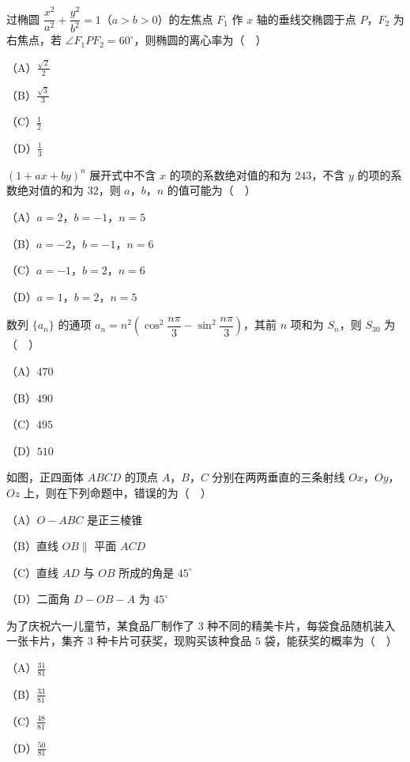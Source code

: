 \begin{question}
过椭圆 $\dfrac{x^2}{a^2}+\dfrac{y^2}{b^2}=1$（$a>b>0$）的左焦点 $F_1$ 作 $x$ 轴的垂线交椭圆于点 $P$，$F_2$ 为右焦点，若 $\angle F_1PF_2=60^\circ$，则椭圆的离心率为（　）

（A）$\frac{\sqrt2}{2}$

（B）$\frac{\sqrt3}{3}$

（C）$\frac12$

（D）$\frac13$

\end{question}
\begin{question}
$(1+ax+by)^n$ 展开式中不含 $x$ 的项的系数绝对值的和为 $243$，不含 $y$ 的项的系数绝对值的和为 $32$，则 $a$，$b$，$n$ 的值可能为（　）

（A）$a=2$，$b=-1$，$n=5$

（B）$a=-2$，$b=-1$，$n=6$

（C）$a=-1$，$b=2$，$n=6$

（D）$a=1$，$b=2$，$n=5$

\end{question}
\begin{question}
数列 $\{a_n\}$ 的通项 $a_n=n^2\left(\cos^2\dfrac{n\pi}{3}-\sin^2\dfrac{n\pi}{3}\right)$，其前 $n$ 项和为 $S_n$，则 $S_{30}$ 为（　）

（A）$470$

（B）$490$

（C）$495$

（D）$510$

\Needspace{0.4\textheight}
\end{question}
\begingroup
\renewenvironment{question}{\Needspace{0.5\textheight}}{}
\begin{question}
如图，正四面体 $ABCD$ 的顶点 $A$，$B$，$C$ 分别在两两垂直的三条射线 $Ox$，$Oy$，$Oz$ 上，则在下列命题中，错误的为（　）

（A）$O-ABC$ 是正三棱锥

（B）直线 $OB\parallel$ 平面 $ACD$

（C）直线 $AD$ 与 $OB$ 所成的角是 $45^\circ$

（D）二面角 $D-OB-A$ 为 $45^\circ$
\nopagebreak[4]
\begin{center}\end{center}
\nopagebreak[4]
\end{question}
\endgroup
\begin{question}
为了庆祝六一儿童节，某食品厂制作了 $3$ 种不同的精美卡片，每袋食品随机装入一张卡片，集齐 $3$ 种卡片可获奖，现购买该种食品 $5$ 袋，能获奖的概率为（　）

（A）$\frac{31}{81}$

（B）$\frac{33}{81}$

（C）$\frac{48}{81}$

（D）$\frac{50}{81}$

\Needspace{0.4\textheight}
\end{question}
